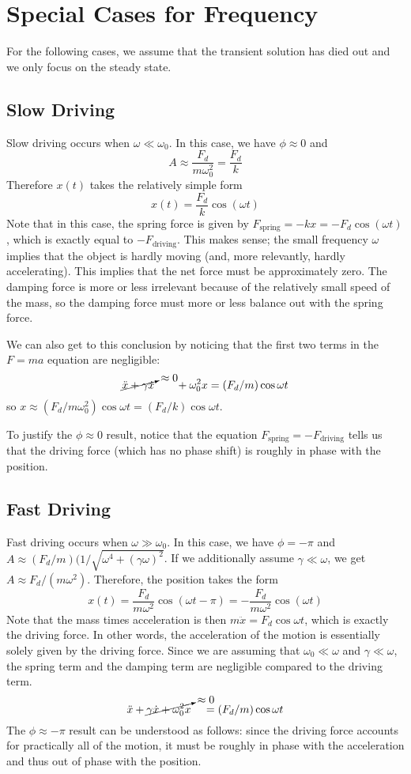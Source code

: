 \section{Special Cases for Frequency}
For the following cases, we assume that the transient solution has died out and we only focus on the steady state.
\subsection*{Slow Driving}
Slow driving occurs when $\omega \ll \omega_0$. In this case, we have $\phi \approx 0$ and 
\[ A \approx \frac{F_d}{m\omega_0^2} = \frac{F_d}{k}\]
Therefore $x(t)$ takes the relatively simple form
\[ x(t) = \frac{F_d}{k}\cos(\omega t)\]
Note that in this case, the spring force is given by $F_\text{spring} = -kx = -F_d\cos(\omega t)$, which is exactly equal to $-F_\text{driving}$. This makes sense; the small frequency $\omega$ implies that the object is hardly moving (and, more relevantly, hardly accelerating). This implies that the net force must be approximately zero. The damping force is more or less irrelevant because of the relatively small speed of the mass, so the damping force must more or less balance out with the spring force. 

We can also get to this conclusion by noticing that the first two terms in the $F=ma$ equation are negligible:
\[ \cancelto{\approx 0}{\ddot x + \gamma \dot x} \;\;\;\;\;\;\; + \omega_0^2x = (F_d/m)\cos\omega t\]
so $x \approx (F_d/m\omega_0^2)\cos\omega t = (F_d/k)\cos\omega t$.

To justify the $\phi\approx 0$ result, notice that the equation $F_\text{spring} = -F_\text{driving}$ tells us that the driving force (which has no phase shift) is roughly in phase with the position.
\subsection*{Fast Driving}
Fast driving occurs when $\omega \gg \omega_0$. In this case, we have $\phi = -\pi$ and $A\approx (F_d/m)(1/\sqrt{\omega^4+(\gamma\omega)^2}$. If we additionally assume $\gamma \ll \omega$, we get $A\approx F_d/(m\omega^2)$. Therefore, the position takes the form
\[ x(t) = \frac{F_d}{m\omega^2}\cos(\omega t-\pi) = -\frac{F_d}{m\omega^2}\cos(\omega t)\]
Note that the mass times acceleration is then $m\ddot x = F_d\cos\omega t$, which is exactly the driving force. In other words, the acceleration of the motion is essentially solely given by the driving force. Since we are assuming that $\omega_0 \ll \omega$ and $\gamma \ll \omega$, the spring term and the damping term are negligible compared to the driving term.
\[ \ddot x + \cancelto{\approx 0}{\gamma\dot x + \omega_0^2x} \;\;\;\; = (F_d/m)\cos\omega t\]
The $\phi\approx-\pi$ result can be understood as follows: since the driving force accounts for practically all of the motion, it must be roughly in phase with the acceleration and thus out of phase with the position.
